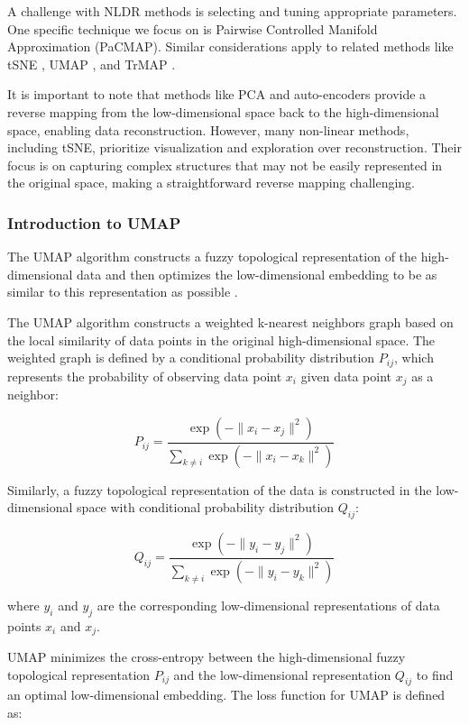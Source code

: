 \documentclass[
  12pt]{article}
\begin{document}
A challenge with NLDR methods is selecting and tuning appropriate
parameters. One specific technique we focus on is Pairwise Controlled
Manifold Approximation (PaCMAP). Similar considerations apply to related
methods like tSNE \citep{Laurens2008}, UMAP \citep{Leland2018}, and
TrMAP \citep{article02}.

It is important to note that methods like PCA and auto-encoders
\citep{article65} provide a reverse mapping from the low-dimensional
space back to the high-dimensional space, enabling data reconstruction.
However, many non-linear methods, including tSNE, prioritize
visualization and exploration over reconstruction. Their focus is on
capturing complex structures that may not be easily represented in the
original space, making a straightforward reverse mapping challenging.

\hypertarget{introduction-to-umap}{%
\subsubsection{Introduction to UMAP}\label{introduction-to-umap}}

The UMAP algorithm constructs a fuzzy topological representation of the
high-dimensional data and then optimizes the low-dimensional embedding
to be as similar to this representation as possible \citep{Leland2018}.

The UMAP algorithm constructs a weighted k-nearest neighbors graph based
on the local similarity of data points in the original high-dimensional
space. The weighted graph is defined by a conditional probability
distribution \(P_{ij}\), which represents the probability of observing
data point \(x_i\) given data point \(x_j\) as a neighbor:

\[
P_{ij} = \frac{\exp(-\lVert x_i - x_j \rVert^2)}{\sum_{k \neq i} \exp(-\lVert x_i - x_k \rVert^2)}
\]

Similarly, a fuzzy topological representation of the data is constructed
in the low-dimensional space with conditional probability distribution
\(Q_{ij}\):

\[
Q_{ij} = \frac{\exp(-\lVert y_i - y_j \rVert^2)}{\sum_{k \neq i} \exp(-\lVert y_i - y_k \rVert^2)}
\]

where \(y_i\) and \(y_j\) are the corresponding low-dimensional
representations of data points \(x_i\) and \(x_j\).

UMAP minimizes the cross-entropy between the high-dimensional fuzzy
topological representation \(P_{ij}\) and the low-dimensional
representation \(Q_{ij}\) to find an optimal low-dimensional embedding.
The loss function for UMAP is defined as:
\end{document}
